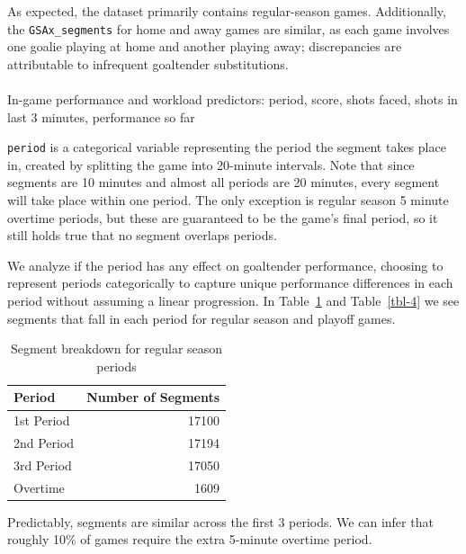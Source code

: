 \documentclass[
  letterpaper,
  DIV=11,
  numbers=noendperiod]{scrartcl}
\makeatletter
\let\oldparagraph\paragraph
\renewcommand{\paragraph}{
    \@ifstar
      \xxxParagraphStar
      \xxxParagraphNoStar
  }
\newcommand{\xxxParagraphStar}[1]{\oldparagraph*{#1}\mbox{}}
\newcommand{\xxxParagraphNoStar}[1]{\oldparagraph{#1}\mbox{}}
\makeatother
\begin{document}
As expected, the dataset primarily contains regular-season games.
Additionally, the \texttt{GSAx\_segments} for home and away games are
similar, as each game involves one goalie playing at home and another
playing away; discrepancies are attributable to infrequent goaltender
substitutions.

\paragraph{In-game performance and workload predictors: period, score,
shots faced, shots in last 3 minutes, performance so
far}\label{sec-period}

\texttt{period} is a categorical variable representing the period the
segment takes place in, created by splitting the game into 20-minute
intervals. Note that since segments are 10 minutes and almost all
periods are 20 minutes, every segment will take place within one period.
The only exception is regular season 5 minute overtime periods, but
these are guaranteed to be the game's final period, so it still holds
true that no segment overlaps periods.

We analyze if the period has any effect on goaltender performance,
choosing to represent periods categorically to capture unique
performance differences in each period without assuming a linear
progression. In Table~\ref{tbl-3} and Table~\ref{tbl-4} we see segments
that fall in each period for regular season and playoff games.

\begin{longtable}[]{@{}lr@{}}

\caption{\label{tbl-3}Segment breakdown for regular season periods}

\tabularnewline

\toprule\noalign{}
Period & Number of Segments \\
\midrule\noalign{}
\endhead
\bottomrule\noalign{}
\endlastfoot
1st Period & 17100 \\
2nd Period & 17194 \\
3rd Period & 17050 \\
Overtime & 1609 \\

\end{longtable}

Predictably, segments are similar across the first 3 periods. We can
infer that roughly 10\% of games require the extra 5-minute overtime
period.
\end{document}
